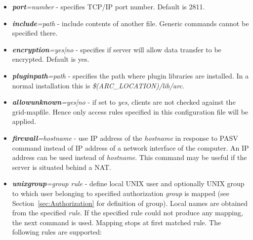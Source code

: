 \documentclass{article}
\begin{document}
\begin{itemize}
\item \textbf{\textit{port}}\textit{=number} - specifies TCP/IP port
  number.  Default is 2811.
\item \textbf{\textit{include}}\textit{=path} - include contents of
  another file. Generic commands cannot be specified there.
\item \textbf{\textit{encryption}}\textit{=yes|no} - specifies if
  server will allow data transfer to be encrypted. Default is yes.
\item \textbf{\textit{pluginpath}}\textit{=path} - specifies the path
  where plugin libraries are installed. In a normal installation this
  is \emph{\$(ARC\_LOCATION)/lib/arc}.
\item \textbf{\textit{allowunknown}}\textit{=yes|no} - if set to
  \emph{yes}, clients are not checked against the grid-mapfile. Hence
  only access rules specified in this configuration file will be
  applied.
\item \textbf{\textit{firewall}}\textit{=hostname} - use IP address of
  the \textit{hostname} in response to PASV command instead of IP
  address of a network interface of the computer. An IP address can be
  used instead of \textit{hostname}. This command may be useful if the
  server is situated behind a NAT.
\item \textbf{\textit{unixgroup}}\textit{=group rule} - define local
  UNIX user and optionally UNIX group to which user belonging to
  specified authorization \textit{group} is mapped (see
  Section~\ref{sec:Authorization} for definition of group). Local
  names are obtained from the specified \textit{rule}. If the
  specified rule could not produce any mapping, the next command is
  used. Mapping stops at first matched rule. The following rules are
  supported:


\end{itemize}
\end{document}
